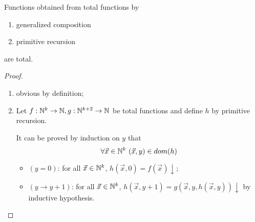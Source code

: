\begin{proposition}
  Functions obtained from total functions by
\begin{enumerate}
\item generalized composition
\item primitive recursion
\end{enumerate}
are total.
\begin{proof}
  \begin{enumerate}
    \item obvious by definition;
    \item Let $f:\mathbb{N}^k\rightarrow\mathbb{N}, g:\mathbb{N}^{k+2}\rightarrow\mathbb{N}$ be total functions and define
    $h$ by primitive recursion.
    
    It can be proved by induction on $y$ that 
    \begin{equation*}
      \forall \vec{x}\in\nat^k  \ (\vec{x},y) \in dom(h)
    \end{equation*}
    \begin{itemize}
      \item $(y=0)$: for all $\vec{x}\in\mathbb{N}^k$, $h(\vec{x},0) = f(\vec{x})\downarrow$;
      \item $(y\rightarrow y+1)$: for all $\vec{x}\in\mathbb{N}^k$, $h(\vec{x},y+1) = g(\vec{x},y,h(\vec{x},y))\downarrow$ by inductive hypothesis.
    \end{itemize}
  \end{enumerate}
\end{proof}
\end{proposition}





